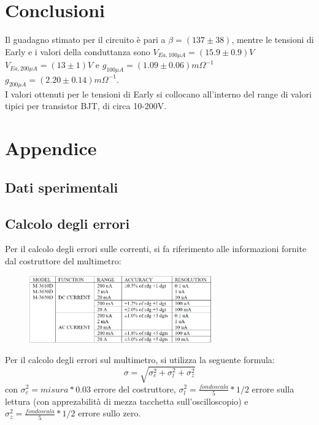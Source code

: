 \documentclass{article}
\begin{document}
\section{Conclusioni}
Il guadagno stimato per il circuito è pari a $\beta=(137\pm38)$, mentre le tensioni di Early e i valori della conduttanza sono $V_{Ea,100\mu A}=(15.9\pm 0.9) V$ $V_{Ea,200\mu A}=(13\pm 1) V $ e $g_{100 \mu A}=(1.09 \pm 0.06) m\Omega^{-1} $ $g_{200 \mu A}=(2.20 \pm 0.14) m\Omega^{-1}$.\\
I valori ottenuti per le tensioni di Early si collocano all'interno del range di valori tipici per transistor BJT, di circa 10-200V.


\newpage
\section{Appendice}

\subsection{Dati sperimentali}


\subsection{Calcolo degli errori}
Per il calcolo degli errori sulle correnti, si fa riferimento alle informazioni fornite dal costruttore del multimetro:
\begin{figure}[H]
    \centering
    \includegraphics[width=0.7\textwidth]{Errore_multimetro.jpg}
\end{figure}
Per il calcolo degli errori sul multimetro, si utilizza la seguente formula:
\begin{equation}
    \sigma=\sqrt{\sigma_c^2+\sigma_l^2+\sigma_z^2}
\end{equation}
con $\sigma_c^2 = misura*0.03$ errore del costruttore, $\sigma_l^2= \frac{fondo scala}{5}*1/2$ errore sulla lettura (con apprezabilità di mezza tacchetta sull'oscilloscopio) e $\sigma_z^2= \frac{fondo scala}{5}*1/2$ errore sullo zero.
\end{document}
